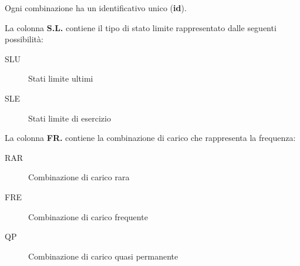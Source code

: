 Ogni combinazione ha un identificativo unico (\textbf{id}).

La colonna \textbf{S.L.} contiene il tipo di stato limite rappresentato dalle
seguenti possibilità:

\begin{description}
    \item[SLU] Stati limite ultimi
    \item[SLE] Stati limite di esercizio
\end{description}

La colonna \textbf{FR.} contiene la combinazione di carico che rappresenta la frequenza:

\begin{description}
    \item[RAR] Combinazione di carico rara
    \item[FRE] Combinazione di carico frequente
    \item[QP] Combinazione di carico quasi permanente
\end{description}
